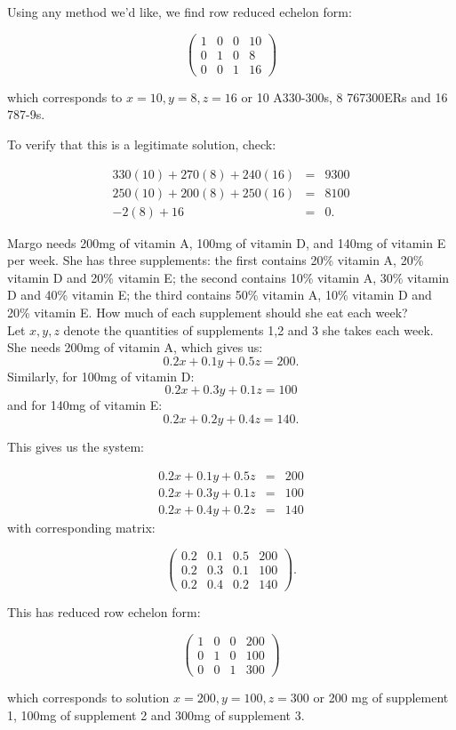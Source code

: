 \begin{example}
Using any method we'd like, we find row reduced echelon form:

$$ \left( \begin{array}{rrr|r}
1 & 0 & 0& 10\\
0 & 1 & 0 & 8\\
0 & 0 & 1 & 16
\end{array}\right)$$

which corresponds to $x=10, y=8, z=16$ or 10 A330-300s, 8 767300ERs and 16 787-9s.

To verify that this is a legitimate solution, check:

\begin{eqnarray*}
330(10)+270(8)+240(16)&=&9300\\
250(10)+200(8)+250(16)&=&8100\\
-2(8)+16&=&0.
\end{eqnarray*}



\end{example}


\begin{example}\label{Example:Vitamin}
Margo needs 200mg of vitamin A, 100mg of vitamin D, and 140mg of vitamin E per week. She has three supplements: the first contains 20\% vitamin A, 20\% vitamin D and 20\%
vitamin E; the second contains 10\% vitamin A, 30\% vitamin D and 40\% vitamin E; the third contains 50\% vitamin A, 10\% vitamin D and 20\% vitamin E. How much of each
supplement should she eat each week?\\

Let $x,y,z$ denote the quantities of supplements 1,2 and 3 she takes each week.  She needs 200mg of vitamin A, which gives us: $$0.2x+0.1y+0.5z=200.$$  Similarly, for 100mg of vitamin D: $$0.2x+0.3y+0.1z=100$$ and for 140mg of vitamin E: $$0.2x+0.2y+0.4z=140.$$

This gives us the system:


\begin{eqnarray*}
0.2x+0.1y+0.5z&=&200\\
0.2x+0.3y+0.1z&=&100\\
0.2x+0.4y+0.2z&=&140
\end{eqnarray*}
 with corresponding matrix:

$$ \left( \begin{array}{rrr|r}
0.2 & 0.1 & 0.5& 200\\
0.2 & 0.3 & 0.1 & 100\\
0.2 & 0.4 & 0.2 & 140
\end{array}\right).$$

This has reduced row echelon form:

$$ \left( \begin{array}{rrr|r}
1 & 0 & 0& 200\\
0 & 1 & 0 & 100\\
0 & 0 & 1 & 300
\end{array}\right)$$

which corresponds to solution $x=200, y=100, z=300$ or 200 mg of supplement 1, 100mg of supplement 2 and 300mg of supplement 3.


\end{example}


